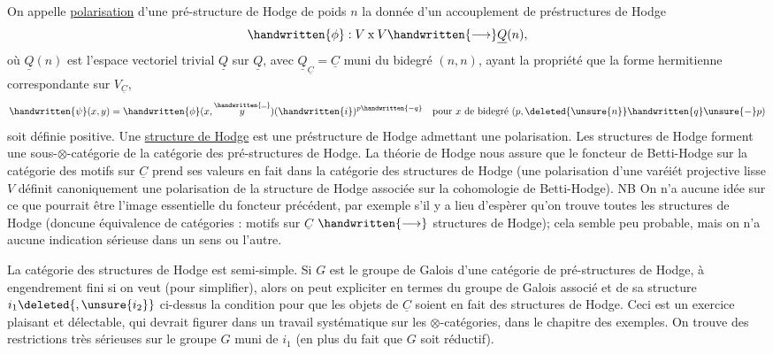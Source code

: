 On appelle  \uline{polarisation} d'une pré-structure de Hodge de poids $n$ la donnée d'un accouplement de préstructures de Hodge
\[
\handwritten{\phi}:V\mathbin{\mathrm{x}}V\handwritten{\longrightarrow}\underline{Q}(n),
\]
où $\underline{Q}(n)$ est l'espace vectoriel trivial $\underline{Q}$ sur $\underline{Q}$, avec $\underline{Q}_{\underline{C}}=\underline{C}$ muni du  bidegré $(n,n)$, ayant la propriété que la forme hermitienne correspondante sur $V_{\underline{C}}$,
\margin{\handwritten{\uline{$\unsure{\psi|\phi}$}}}
\[
\handwritten{\psi}(x,y)=\handwritten{\phi}(x,\overset{\handwritten{\rule{0.5em}{0.4pt}}}{y})(\handwritten{i})^{p\handwritten{-q}}\quad\text{pour }x\text{ de bidegré }(p,\deleted{\unsure{n}}\handwritten{q}\unsure{-}p)
\]
soit définie positive. Une \uline{structure de Hodge} est une préstructure de Hodge admettant une polarisation. Les structures de Hodge forment une sous-$\otimes$-catégorie de la catégorie des pré-structures de Hodge. La théorie de Hodge nous assure que le foncteur de Betti-Hodge sur la catégorie des
%
motifs sur $\underline{C}$ prend ses valeurs en fait dans la catégorie des structures de Hodge (une polarisation d'une varéiét projective lisse $V$ définit canoniquement une polarisation de la structure de Hodge associée sur la cohomologie de Betti-Hodge). NB On n'a aucune idée sur ce que pourrait être l'image essentielle du foncteur précédent, par exemple s'il y a lieu d'espèrer qu'on trouve toutes les structures de Hodge (doncune équivalence de catégories : motifs sur $\underline{C}$ $\handwritten{\longrightarrow}$ structures de Hodge); cela semble peu probable, mais on n'a aucune indication sérieuse dans un sens ou l'autre.

La catégorie des  structures de Hodge est semi-simple.  Si $G$ est le groupe de Galois d'une \inserted{$\unsure{\otimes|\Omega}$-}catégorie  de pré-structures de Hodge, à engendrement fini si on veut (pour simplifier), alors on peut expliciter en termes du groupe de Galois associé et de sa structure $i_1\deleted{,\unsure{i_2}}$ ci-dessus la condition  pour que les objets de $\underline{C}$ soient en fait des structures de Hodge. Ceci est un exercice plaisant et délectable, qui devrait figurer dans un travail systématique sur les $\otimes$-catégories, dans le chapitre des exemples. On trouve des restrictions très sérieuses sur le groupe $G$  muni de $i_1$ (en plus du fait que $G$ soit réductif).

